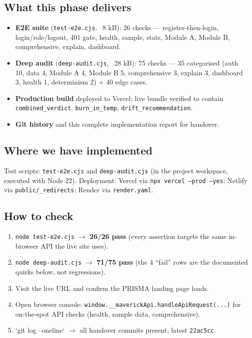 \documentclass[11pt,a4paper]{article}
\newcommand{\code}[1]{\texttt{\small #1}}
\begin{document}
\subsection*{What this phase delivers}
\begin{itemize}[leftmargin=1.5em]
  \item \textbf{E2E suite} (\code{test-e2e.cjs}, ~8 kB): 26 checks --- register-then-login,
        login/role/logout,
        401 gate, health, sample, stats, Module A, Module B, comprehensive, explain, dashboard.
  \item \textbf{Deep audit} (\code{deep-audit.cjs}, ~28 kB): 75 checks --- 35 categorised
        (auth 10, data 4, Module A 4, Module B 5, comprehensive 3, explain 3, dashboard 3, health 1,
        determinism 2) + 40 edge cases.
  \item \textbf{Production build} deployed to Vercel; live bundle verified to contain
        \code{combined\_verdict}, \code{burn\_in\_temp}, \code{drift\_recommendation}.
  \item \textbf{Git history} and this complete implementation report for handover.
\end{itemize}

\subsection*{Where we have implemented}
Test scripts: \code{test-e2e.cjs} and \code{deep-audit.cjs} (in the project workspace,
executed with Node 22). Deployment: Vercel via \code{npx vercel --prod --yes}; Netlify via
\code{public/\_redirects}; Render via \code{render.yaml}.

\subsection*{How to check}
\begin{enumerate}[leftmargin=1.5em]
  \item \code{node test-e2e.cjs} $\rightarrow$ \textbf{26/26 pass} (every assertion targets the
        same in-browser API the live site uses).
  \item \code{node deep-audit.cjs} $\rightarrow$ \textbf{71/75 pass} (the 4 ``fail'' rows are the
        documented quirks below, not regressions).
  \item Visit the live URL and confirm the PRISMA landing page loads.
  \item Open browser console: \code{window.\_\_maverickApi.handleApiRequest(...)} for
        on-the-spot API checks (health, sample data, comprehensive).
  \item `git log --oneline` $\rightarrow$ all handover commits present, latest \code{22ac5cc}.
\end{enumerate}
\end{document}
